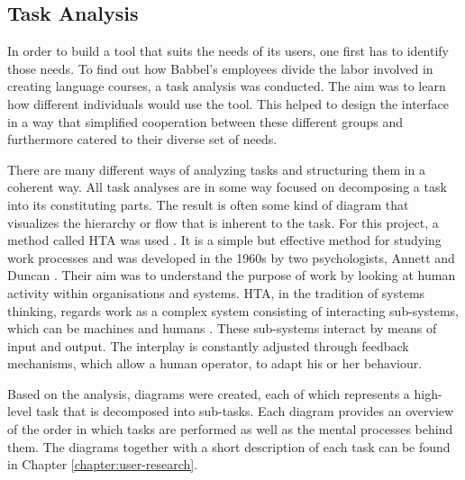 
\subsection{Task Analysis}
In order to build a tool that suits the needs of its users, one first has to identify those needs. To find out how Babbel's employees divide the labor involved in creating language courses, a task analysis was conducted. The aim was to learn how different individuals would use the tool. This helped to design the interface in a way that simplified cooperation between these different groups and furthermore catered to their diverse set of needs.

There are many different ways of analyzing tasks and structuring them in a coherent way. All task analyses are in some way focused on decomposing a task into its constituting parts. The result is often some kind of diagram that visualizes the hierarchy or flow that is inherent to the task. For this project, a method called \ac{HTA} was used \cite{hornsby_hierarchical_2010}. It is a simple but effective method for studying work processes and was developed in the 1960s by two psychologists, Annett and Duncan \cite{shepherd_hierarchial_2000}. Their aim was to understand the purpose of work by looking at human activity within organisations and systems. HTA, in the tradition of systems thinking, regards work as a complex system consisting of  interacting sub-systems, which can be machines and humans \cite{shepherd_hierarchial_2000}. These sub-systems interact by means of input and output. The interplay is constantly adjusted through feedback mechanisms, which allow a human operator, to adapt his or her behaviour.

Based on the analysis, diagrams were created, each of which represents a high-level task that is decomposed into sub-tasks. Each diagram provides an overview of the order in which tasks are performed as well as the mental processes behind them. The diagrams together with a short description of each task can be found in Chapter \ref{chapter:user-research}.

